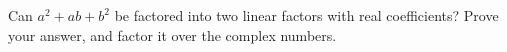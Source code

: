 Can $a^2+ab+b^2$ be factored into two linear factors with real coefficients? Prove your answer, and factor it over the complex numbers.

